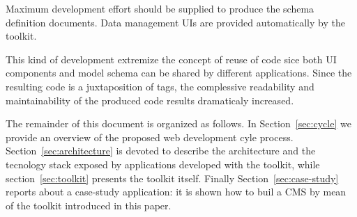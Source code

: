 Maximum development effort should be supplied to produce the schema definition documents. Data management UIs are provided automatically by the toolkit.

This kind of development extremize the concept of reuse of code sice both UI components and model schema can be shared by different applications. Since the resulting code is a juxtaposition of tags, the complessive readability and maintainability of the produced code results dramaticaly increased.

The remainder of this document is organized as follows. In
Section~\ref{sec:cycle} we provide an overview of the proposed web development cyle process. Section~\ref{sec:architecture} is devoted to describe the architecture and the tecnology stack exposed by applications developed with the toolkit, while section~\ref{sec:toolkit} presents the toolkit itself. Finally Section~\ref{sec:case-study} reports about a case-study application: it is shown how to buil a CMS by mean of the toolkit introduced in this paper.%

